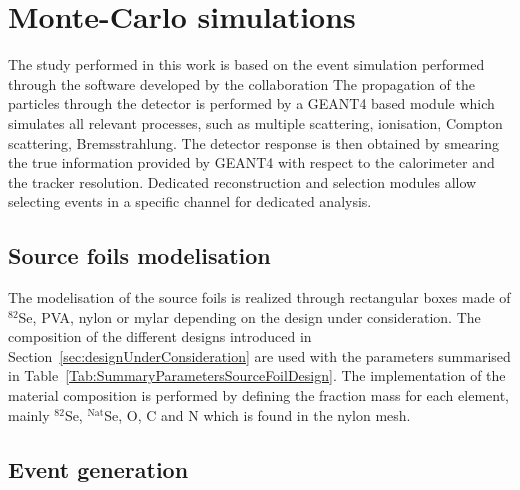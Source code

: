 \documentclass[main.tex]{subfiles}
\begin{document}
\FloatBarrier


\section{Monte-Carlo simulations}\label{sec:MCsimulations}


\NI The study performed in this work is based on the event simulation performed through the software developed by the collaboration The propagation of the particles through the detector is performed by a GEANT4 based module which simulates all relevant processes, such as multiple scattering, ionisation, Compton scattering, Bremsstrahlung. The detector response is then obtained by smearing the true information provided by GEANT4 with respect to the calorimeter and the tracker resolution. Dedicated reconstruction and selection modules allow selecting events in a specific channel for dedicated analysis.


\bigskip




\subsection{Source foils modelisation}


\NI The modelisation of the source foils is realized through rectangular boxes made of $^{\text{82}}$Se, PVA, nylon or mylar depending on the design under consideration. The composition of the different designs introduced in Section~\ref{sec:designUnderConsideration} are used with the parameters summarised in Table~\ref{Tab:SummaryParametersSourceFoilDesign}. The implementation of the material composition is performed by defining the fraction mass for each element, mainly $^{\text{82}}$Se, $^{\text{Nat}}$Se, O, C and N which is found in the nylon mesh.


\subsection{Event generation}
\end{document}
